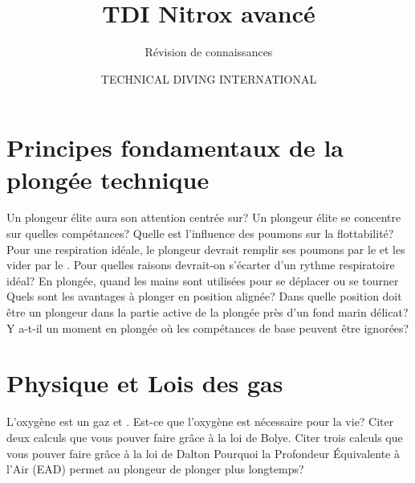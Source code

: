 \documentclass[english,10pt,a4paper]{article}
\title{TDI Nitrox avancé}
\subtitle{Révision de connaissances}
\author{TECHNICAL DIVING INTERNATIONAL}
\begin{document}
	

	\setcounter{section}{1}
	\section{Principes fondamentaux de la plongée technique}

	\begin{outline}
		\1 Un plongeur élite aura son attention centrée sur?
		\1 Un plongeur élite se concentre sur quelles compétances?
		\1 Quelle est l'influence des poumons sur la flottabilité?
		\1 Pour une respiration idéale, le plongeur devrait remplir ses poumons par le \underline{\hspace{1.5cm}} et les vider par le \underline{\hspace{1.5cm}}.
		\1 Pour quelles raisons devrait-on s'écarter d'un rythme respiratoire idéal?
		\1 En plongée, quand les mains sont utilisées pour se déplacer ou se tourner
		\1 Quels sont les avantages à plonger en position alignée?
		\1 Dans quelle position doit être un plongeur dans la partie active de la plongée près 	d'un fond marin délicat?
		\1 Y a-t-il un moment en plongée où les compétances de base peuvent être ignorées?
	\end{outline}
	\pagebreak

	\section{Physique et Lois des gas}
	\begin{outline}
		\1 L'oxygène est un gaz \underline{\hspace{1.5cm}} et \underline{\hspace{1.5cm}}.
		\1 Est-ce que l'oxygène est nécessaire pour la vie?
		\1 Citer deux calculs  que vous pouver faire grâce à la loi de Bolye.
		\1 Citer trois calculs que vous pouver faire grâce à la loi de Dalton
		\1 Pourquoi la Profondeur Équivalente à l'Air (EAD) permet au plongeur de plonger plus longtemps?
	\end{outline}
	\pagebreak

\end{document}
